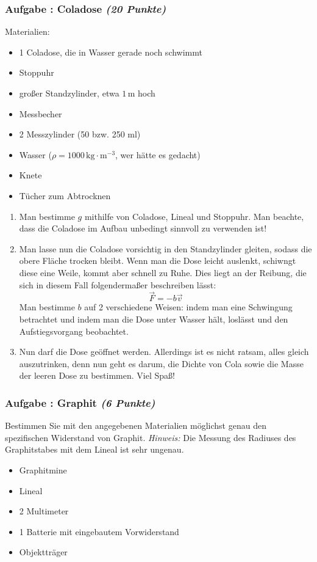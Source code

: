 \documentclass[12pt,a4paper]{article}
\newcommand{\unit}[1]{\,\mathrm{#1}}
\newcommand{\hinweis}{\emph{Hinweis:} }
\newenvironment{abcenum}{\renewcommand{\labelenumi}{(\alph{enumi})} \begin{enumerate}}{\end{enumerate}\renewcommand{\labelenumi}{\theenumi .}}
\newcounter{numlabel}
\newenvironment{problem}[2]{\stepcounter{numlabel} \vspace{1ex} \subsubsection*{Aufgabe \the\value{numlabel}: #1 \emph{(#2 Punkte)}} \renewcommand{\Currentlabel}{Aufgabe \the\value{numlabel}: #1}}{

}
\begin{document}
\begin{problem}{Coladose}{20}
Materialien:
\begin{itemize}
\item 1 Coladose, die in Wasser gerade noch schwimmt
\item Stoppuhr
\item großer Standzylinder, etwa $1\unit{m}$ hoch
\item Messbecher
\item 2 Messzylinder (50 bzw. 250 ml)
\item Wasser ($\rho = 1000 \unit{kg \cdot m^{-3}}$, wer hätte es gedacht)
\item Knete
\item Tücher zum Abtrocknen
\end{itemize}

\begin{abcenum}
\item Man bestimme $g$ mithilfe von Coladose, Lineal und Stoppuhr. Man beachte, dass die Coladose im Aufbau unbedingt sinnvoll zu verwenden ist!
\item Man lasse nun die Coladose vorsichtig in den Standzylinder gleiten, sodass die obere Fläche trocken bleibt. Wenn man die Dose leicht auslenkt, schiwngt diese eine Weile, kommt aber schnell zu Ruhe. Dies liegt an der Reibung, die sich in diesem Fall folgendermaßer beschreiben lässt:
\[
\vec{F}=-b \vec{v}
\]
Man bestimme $b$ auf 2 verschiedene Weisen: indem man eine Schwingung betrachtet und indem man die Dose unter Wasser hält, loslässt und den Aufstiegsvorgang beobachtet.
\item Nun darf die Dose geöffnet werden. Allerdings ist es nicht ratsam, alles gleich auszutrinken, denn nun geht es darum, die Dichte von Cola sowie die Masse der leeren Dose zu bestimmen. Viel Spaß!
\end{abcenum}

% 
\end{problem}



\begin{problem}{Graphit}{6}
Bestimmen Sie mit den angegebenen Materialien möglichst genau den spezifischen Widerstand von Graphit. \hinweis Die Messung des Radiuses des Graphitstabes mit dem Lineal ist sehr ungenau.
\begin{itemize}
\item Graphitmine
\item Lineal
\item 2 Multimeter
\item 1 Batterie mit eingebautem Vorwiderstand
\item Objektträger
\end{itemize}
% 
\end{problem}
\end{document}
